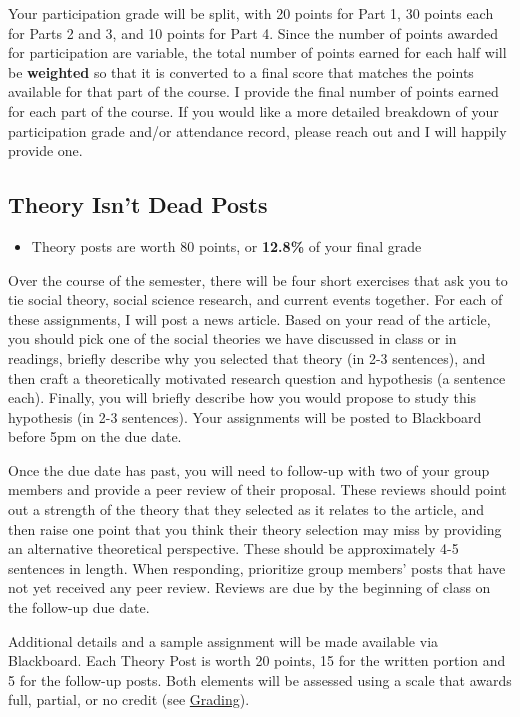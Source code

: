 \documentclass[
]{book}
\newenvironment{rmdblock}[1]
  {\begin{shaded*}
  \begin{itemize}
  \renewcommand{\labelitemi}{
    \raisebox{-.7\height}[0pt][0pt]{
      {\setkeys{Gin}{width=3em,keepaspectratio}\texttt{[image: images/\#1]}}
    }
  }
  \item
  }
  {
  \end{itemize}
  \end{shaded*}
  }
\newenvironment{rmdtip}
  {\begin{rmdblock}{tip}}
  {\end{rmdblock}}
\begin{document}
Your participation grade will be split, with 20 points for Part 1, 30 points each for Parts 2 and 3, and 10 points for Part 4. Since the number of points awarded for participation are variable, the total number of points earned for each half will be \textbf{weighted} so that it is converted to a final score that matches the points available for that part of the course. I provide the final number of points earned for each part of the course. If you would like a more detailed breakdown of your participation grade and/or attendance record, please reach out and I will happily provide one.

\hypertarget{theory-isnt-dead-posts}{%
\subsection{Theory Isn't Dead Posts}\label{theory-isnt-dead-posts}}

\begin{rmdtip}
Theory posts are worth 80 points, or \textbf{12.8\%} of your final grade
\end{rmdtip}

Over the course of the semester, there will be four short exercises that ask you to tie social theory, social science research, and current events together. For each of these assignments, I will post a news article. Based on your read of the article, you should pick one of the social theories we have discussed in class or in readings, briefly describe why you selected that theory (in 2-3 sentences), and then craft a theoretically motivated research question and hypothesis (a sentence each). Finally, you will briefly describe how you would propose to study this hypothesis (in 2-3 sentences). Your assignments will be posted to Blackboard before 5pm on the due date.

Once the due date has past, you will need to follow-up with two of your group members and provide a peer review of their proposal. These reviews should point out a strength of the theory that they selected as it relates to the article, and then raise one point that you think their theory selection may miss by providing an alternative theoretical perspective. These should be approximately 4-5 sentences in length. When responding, prioritize group members' posts that have not yet received any peer review. Reviews are due by the beginning of class on the follow-up due date.

Additional details and a sample assignment will be made available via Blackboard. Each Theory Post is worth 20 points, 15 for the written portion and 5 for the follow-up posts. Both elements will be assessed using a scale that awards full, partial, or no credit (see \href{grading.html}{Grading}).
\end{document}
